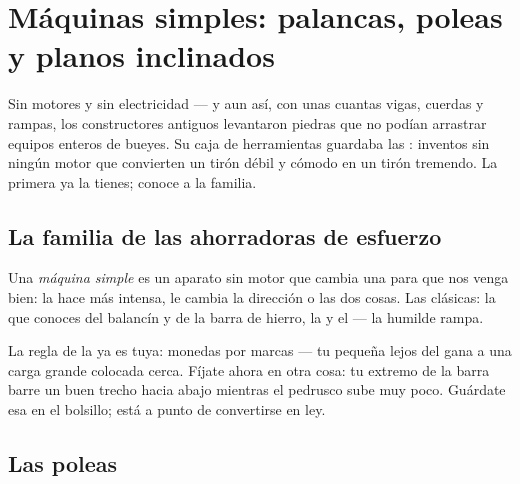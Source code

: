 \chapter{Máquinas simples: palancas, poleas y planos inclinados}\label{ch:g5:simple-machines}

Sin motores y sin electricidad --- y aun así, con unas cuantas vigas,
cuerdas y rampas, los constructores antiguos levantaron piedras que no
podían arrastrar equipos enteros de bueyes. Su caja de herramientas
guardaba las \emph{}: inventos sin ningún motor que
convierten un tirón débil y cómodo en un tirón tremendo. La primera ya
la tienes; conoce a la familia.

\section{La familia de las ahorradoras de esfuerzo}

\begin{definition}\label{def:g5:simple-machines:machine}
Una \emph{máquina simple} es un aparato sin
motor que cambia una  para que nos venga bien: la hace más
intensa, le cambia la dirección o las dos cosas. Las clásicas: la
\emph{} que conoces del balancín y de la barra de hierro, la
\emph{} y el \emph{} --- la humilde rampa.
\end{definition}

\begin{example}\label{ex:g5:simple-machines:lever}
La regla de la  ya es tuya: monedas por marcas --- tu
 pequeña lejos del  gana a una carga grande
colocada cerca. Fíjate ahora en otra cosa: tu extremo de la barra
barre un buen trecho hacia abajo mientras el pedrusco sube muy poco.
Guárdate esa  en el bolsillo; está a punto de convertirse
en ley.
\end{example}

\section{Las poleas}

